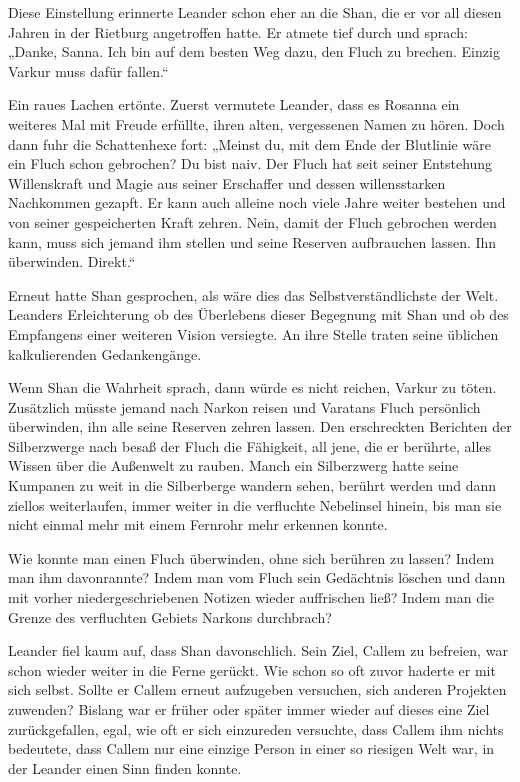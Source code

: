 Diese Einstellung erinnerte Leander schon eher an die Shan, die er vor all diesen Jahren in der Rietburg angetroffen hatte. Er atmete tief durch und sprach: „Danke, Sanna. Ich bin auf dem besten Weg dazu, den Fluch zu brechen. Einzig Varkur muss dafür fallen.“

Ein raues Lachen ertönte. Zuerst vermutete Leander, dass es Rosanna ein weiteres Mal mit Freude erfüllte, ihren alten, vergessenen Namen zu hören. Doch dann fuhr die Schattenhexe fort: „Meinst du, mit dem Ende der Blutlinie wäre ein Fluch schon gebrochen? Du bist naiv. Der Fluch hat seit seiner Entstehung Willenskraft und Magie aus seiner Erschaffer und dessen willensstarken Nachkommen gezapft. Er kann auch alleine noch viele Jahre weiter bestehen und von seiner gespeicherten Kraft zehren. Nein, damit der Fluch gebrochen werden kann, muss sich jemand ihm stellen und seine Reserven aufbrauchen lassen. Ihn überwinden. Direkt.“

Erneut hatte Shan gesprochen, als wäre dies das Selbstverständlichste der Welt. Leanders Erleichterung ob des Überlebens dieser Begegnung mit Shan und ob des Empfangens einer weiteren Vision versiegte. An ihre Stelle traten seine üblichen kalkulierenden Gedankengänge.

Wenn Shan die Wahrheit sprach, dann würde es nicht reichen, Varkur zu töten. Zusätzlich müsste jemand nach Narkon reisen und Varatans Fluch persönlich überwinden, ihn alle seine Reserven zehren lassen. Den erschreckten Berichten der Silberzwerge nach besaß der Fluch die Fähigkeit, all jene, die er berührte, alles Wissen über die Außenwelt zu rauben. Manch ein Silberzwerg hatte seine Kumpanen zu weit in die Silberberge wandern sehen, berührt werden und dann ziellos weiterlaufen, immer weiter in die verfluchte Nebelinsel hinein, bis man sie nicht einmal mehr mit einem Fernrohr mehr erkennen konnte.

Wie konnte man einen Fluch überwinden, ohne sich berühren zu lassen? Indem man ihm davonrannte? Indem man vom Fluch sein Gedächtnis löschen und dann mit vorher niedergeschriebenen Notizen wieder auffrischen ließ? Indem man die Grenze des verfluchten Gebiets Narkons durchbrach?

Leander fiel kaum auf, dass Shan davonschlich. Sein Ziel, Callem zu befreien, war schon wieder weiter in die Ferne gerückt. Wie schon so oft zuvor haderte er mit sich selbst. Sollte er Callem erneut aufzugeben versuchen, sich anderen Projekten zuwenden? Bislang war er früher oder später immer wieder auf dieses eine Ziel zurückgefallen, egal, wie oft er sich einzureden versuchte, dass Callem ihm nichts bedeutete, dass Callem nur eine einzige Person in einer so riesigen Welt war, in der Leander einen Sinn finden konnte.

